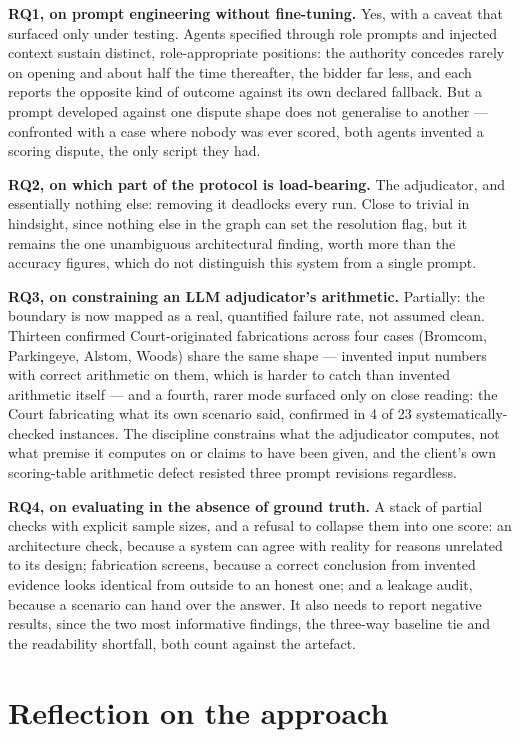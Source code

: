 \textbf{RQ1, on prompt engineering without fine-tuning.} Yes, with a caveat
that surfaced only under testing. Agents specified through role prompts and
injected context sustain distinct, role-appropriate positions: the
authority concedes rarely on opening and about half the time thereafter,
the bidder far less, and each reports the opposite kind of outcome against
its own declared fallback. But a prompt developed against one dispute shape
does not generalise to another --- confronted with a case where nobody was
ever scored, both agents invented a scoring dispute, the only script they
had.

\textbf{RQ2, on which part of the protocol is load-bearing.} The
adjudicator, and essentially nothing else: removing it deadlocks every run.
Close to trivial in hindsight, since nothing else in the graph can set the
resolution flag, but it remains the one unambiguous architectural finding,
worth more than the accuracy figures, which do not distinguish this system
from a single prompt.

\textbf{RQ3, on constraining an LLM adjudicator's arithmetic.} Partially:
the boundary is now mapped as a real, quantified failure rate, not assumed
clean. Thirteen confirmed Court-originated fabrications across four cases
(Bromcom, Parkingeye, Alstom, Woods) share the same shape --- invented input
numbers with correct arithmetic on them, which is harder to catch than
invented arithmetic itself --- and a fourth, rarer mode surfaced only on
close reading: the Court fabricating what its own scenario said, confirmed
in 4 of 23 systematically-checked instances. The discipline constrains what
the adjudicator computes, not what premise it computes on or claims to have
been given, and the client's own scoring-table arithmetic defect resisted
three prompt revisions regardless.

\textbf{RQ4, on evaluating in the absence of ground truth.} A stack of
partial checks with explicit sample sizes, and a refusal to collapse them
into one score: an architecture check, because a system can agree with
reality for reasons unrelated to its design; fabrication screens, because a
correct conclusion from invented evidence looks identical from outside to
an honest one; and a leakage audit, because a scenario can hand over the
answer. It also needs to report negative results, since the two most
informative findings, the three-way baseline tie and the readability
shortfall, both count against the artefact.

\section{Reflection on the approach}

